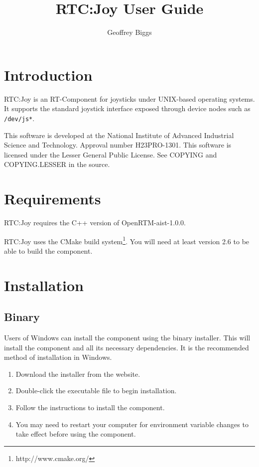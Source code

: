 \documentclass[a4paper,10pt]{article}
\title{RTC:Joy User Guide}
\author{Geoffrey Biggs}
\begin{document}
\maketitle

\section{Introduction}
\label{sec:intro}

RTC:Joy is an RT-Component for joysticks under UNIX-based operating systems. It
supports the standard joystick interface exposed through device nodes such as
\verb|/dev/js*|.

This software is developed at the National Institute of Advanced Industrial
Science and Technology. Approval number H23PRO-1301. This software is licensed
under the Lesser General Public License. See COPYING and COPYING.LESSER in the
source.

\section{Requirements}
\label{sec:requirements}

RTC:Joy requires the C++ version of OpenRTM-aist-1.0.0.

RTC:Joy uses the CMake build system\footnote{http://www.cmake.org/}. You will
need at least version 2.6 to be able to build the component.

\section{Installation}
\label{sec:installation}

\subsection{Binary}

Users of Windows can install the component using the binary installer. This
will install the component and all its necessary dependencies. It is the
recommended method of installation in Windows.

\begin{enumerate}
  \item Download the installer from the website.
  \item Double-click the executable file to begin installation.
  \item Follow the instructions to install the component.
  \item You may need to restart your computer for environment variable changes
  to take effect before using the component.
\end{enumerate}
\end{document}
